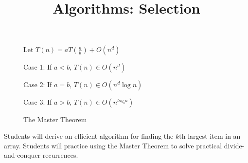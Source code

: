 \documentclass{tufte-handout}
\title{Algorithms: Selection}
\date{}
\begin{document}
\maketitle
\begin{figure}
\caption{The Master Theorem}
Let $T(n) = a T(\frac{n}{b}) + O(n^d)$ 

Case 1: If $a < b$, $T(n) \in O(n^d)$

Case 2: If $a = b$, $T(n) \in O(n^d \log n)$

Case 3: If $a > b$, $T(n) \in O(n^{log_b a})$
\end{figure}

\begin{objective}
  Students will derive an efficient algorithm for finding the $k$th largest item in an array. Students will practice using the Master Theorem to solve practical divide-and-conquer recurrences.
\end{objective}
\end{document}
